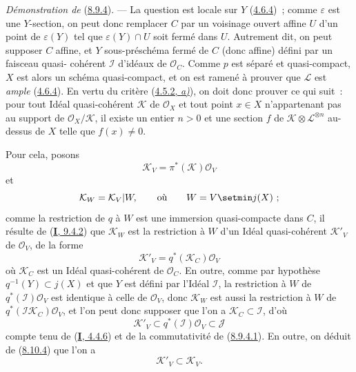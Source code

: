 \begin{env}[8.10.6]
\label{II.8.10.6-fr}
\emph{Démonstration de} (\hyperref[II.8.9.4-fr]{8.9.4}). --- La question est
locale sur $Y$ (\hyperref[II.4.6.4-fr]{4.6.4})~; comme $\varepsilon$ est une
$Y$-section, on peut donc remplacer $C$ par un voisinage ouvert affine $U$
d'un point de $\varepsilon(Y)$ tel que $\varepsilon(Y)\cap U$ soit fermé dans
$U$. Autrement dit, on peut supposer $C$ affine, et $Y$ sous-préschéma fermé
de $C$ (donc affine) défini par un faisceau quasi-%
cohérent $\mathcal{I}$ d'idéaux de $\mathcal{O}_C$. Comme $p$ est séparé et
quasi-compact, $X$ est alors un schéma quasi-compact, et on est ramené à
prouver que $\mathcal{L}$ est \emph{ample}
(\hyperref[II.4.6.4-fr]{4.6.4}). En vertu du critère
(\hyperref[II.4.5.2-fr]{4.5.2, \emph{a)}}), on doit donc prouver ce qui suit~: pour
tout Idéal quasi-cohérent $\mathcal{K}$ de $\mathcal{O}_X$ et tout point
$x\in X$ n'appartenant pas au support de $\mathcal{O}_X/\mathcal{K}$, il
existe un entier $n>0$ et une section $f$ de
$\mathcal{K}\otimes\mathcal{L}^{\otimes n}$ au-dessus de $X$ telle que
$f(x)\neq0$.

Pour cela, posons
\[
  \mathcal{K}_V=\pi^*(\mathcal{K})\mathcal{O}_V
\]
et
\[
  \mathcal{K}_W=\mathcal{K}_V|W,\qquad\hbox{où}\qquad W=V\setmin j(X)~;
\]
comme la restriction de $q$ à $W$ est une immersion quasi-compacte dans $C$,
il résulte de (\hyperref[I.9.4.2-fr]{\textbf{I}, 9.4.2}) que $\mathcal{K}_W$ est la
restriction à $W$ d'un Idéal quasi-cohérent $\mathcal{K}'_V$ de
$\mathcal{O}_V$, de la forme
\[
  \mathcal{K}'_V=q^*(\mathcal{K}_C)\mathcal{O}_V
\]
où $\mathcal{K}_C$ est un Idéal quasi-cohérent de $\mathcal{O}_C$. En outre,
comme par hypothèse $q^{-1}(Y)\subset j(X)$ et que $Y$ est défini par l'Idéal
$\mathcal{I}$, la restriction à $W$ de $q^*(\mathcal{I})\mathcal{O}_V$ est
identique à celle de $\mathcal{O}_V$, donc $\mathcal{K}_W$ est aussi la
restriction à $W$ de $q^*(\mathcal{I}\mathcal{K}_C)\mathcal{O}_V$, et l'on
peut donc supposer que l'on a $\mathcal{K}_C\subset\mathcal{I}$, d'où
\begin{equation}
\label{II.8.10.6.1-fr}
  \mathcal{K}'_V\subset q^*(\mathcal{I})\mathcal{O}_V\subset\mathcal{J}
\tag{8.10.6.1}
\end{equation}
compte tenu de (\hyperref[I.4.4.6-fr]{\textbf{I}, 4.4.6}) et de la commutativité de
(\hyperref[II.8.9.4.1-fr]{8.9.4.1}). En outre, on déduit de
(\hyperref[II.8.10.4-fr]{8.10.4}) que l'on a
\begin{equation}
\label{II.8.10.6.2-fr}
  \mathcal{K}'_V\subset\mathcal{K}_V.
\tag{8.10.6.2}
\end{equation}


\end{env}
